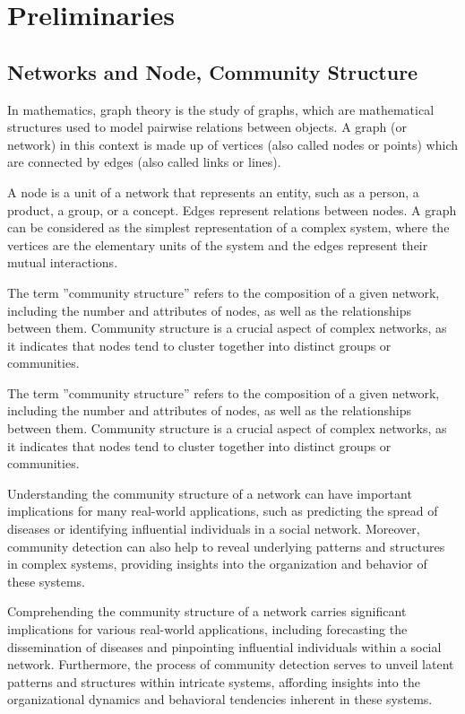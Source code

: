 \section{Preliminaries}
\subsection{Networks and Node, Community Structure}

\indent In mathematics, graph theory is the study of graphs, which are mathematical structures used to model pairwise relations between objects. A graph (or network) in this context is made up of vertices (also called nodes or points) which are connected by edges (also called links or lines).

A node is a unit of a network that represents an entity, such as a person, a product, a group, or a concept. Edges represent relations between nodes. A graph can be considered as the simplest representation of a complex system, where the vertices are the elementary units of the system and the edges represent their mutual interactions.

The term ”community structure” refers to the composition of a given network, including the number and attributes of nodes, as well as the relationships between them. Community structure is a crucial aspect of complex networks, as it indicates that nodes tend to cluster together into distinct groups or communities.

The term ”community structure” refers to the composition of a given network, including the number and attributes of nodes, as well as the relationships between them. Community structure is a crucial aspect of complex networks, as it indicates that nodes tend to cluster together into distinct groups or communities.

Understanding the community structure of a network can have important implications for many real-world applications, such as predicting the spread of diseases or identifying influential individuals in a social network. Moreover, community detection can also help to reveal underlying patterns and structures in complex systems, providing insights into the organization and behavior of these systems.



Comprehending the community structure of a network carries significant implications for various real-world applications, including forecasting the dissemination of diseases and pinpointing influential individuals within a social network. Furthermore, the process of community detection serves to unveil latent patterns and structures within intricate systems, affording insights into the organizational dynamics and behavioral tendencies inherent in these systems.
